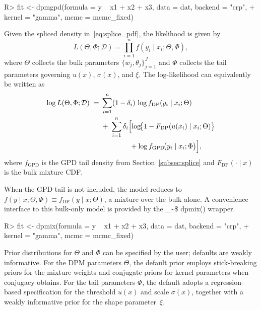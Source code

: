 \documentclass[preprint,12pt,authoryear]{elsarticle}
\makeatletter
\newcommand\code{\bgroup\@makeother\_\@makeother\~\@makeother\$\@codex}
\def\@codex#1{{\normalfont\ttfamily\hyphenchar\font=-1 #1}\egroup}
\renewenvironment{Schunk}{\vspace{0pt}}{\vspace{-0.1\baselineskip}}
\makeatother
\begin{document}
\begin{Schunk}
\begin{Sinput}
R> fit <- dpmgpd(formula = y ~ x1 + x2 + x3, data = dat, backend = "crp",
+                kernel = "gamma", mcmc = mcmc_fixed)
\end{Sinput}
\end{Schunk}

Given the spliced density in~\eqref{eq:splice_pdf}, the likelihood is given by
\begin{equation}
  L(\Theta,\Phi;\mathcal{D})
  =\prod_{i=1}^n f(y_i\mid x_i;\Theta,\Phi),
  \label{eq:overview-lik}
\end{equation}
where $\Theta$ collects the bulk parameters
$\{w_j,\theta_j\}_{j=1}^J$ and $\Phi$ collects the tail parameters
governing $u(x)$, $\sigma(x)$, and $\xi$.  The log-likelihood can
equivalently be written as
\begin{align*}
  \log L(\Theta,\Phi;\mathcal{D})
  \;=&\;\sum_{i=1}^n (1-\delta_i)\,\log f_{\mathrm{DP}}(y_i\mid x_i;\Theta)
  \\
  &\;+\;\sum_{i=1}^n \delta_i
  \Bigl[
    \log\!\bigl\{1-F_{\mathrm{DP}}(u(x_i)\mid x_i;\Theta)\bigr\}\\
  &\hphantom{{}+\;\sum_{i=1}^n \delta_i\Bigl[}
    {}+\log f_{\mathrm{GPD}}\!\bigl(y_i\mid x_i;\Phi\bigr)
  \Bigr],
\end{align*}
where $f_{\mathrm{GPD}}$ is the GPD tail density from
Section~\ref{subsec:splice} and $F_{\mathrm{DP}}(\cdot\mid x)$ is the
bulk mixture CDF.

When the GPD tail is not included, the model reduces to
$f(y\mid x;\Theta, \Phi) \equiv f_{\text{DP}}(y \mid x; \Theta)$, a
mixture over the bulk alone.  A convenience interface to this bulk-only
model is provided by the \code{dpmix()} wrapper.

\begin{Schunk}
\begin{Sinput}
R> fit <- dpmix(formula = y ~ x1 + x2 + x3, data = dat, backend = "crp",
+                  kernel = "gamma",  mcmc = mcmc_fixed)
\end{Sinput}
\end{Schunk}

Prior distributions for $\Theta$ and $\Phi$ can be specified by the
user; defaults are weakly informative.  For the DPM parameters
$\Theta$, the default prior employs stick-breaking priors for the
mixture weights and conjugate priors for kernel parameters when
conjugacy obtains.  For the tail parameters $\Phi$, the default adopts
a regression-based specification for the threshold $u(x)$ and scale
$\sigma(x)$, together with a weakly informative prior for the shape
parameter~$\xi$.
\end{document}
